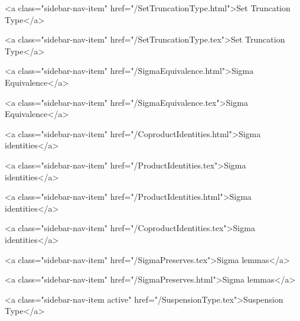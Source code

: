       
        
          <a class="sidebar-nav-item" href="/SetTruncationType.html">Set Truncation Type</a>
        
      
    
      
        
          <a class="sidebar-nav-item" href="/SetTruncationType.tex">Set Truncation Type</a>
        
      
    
      
        
          <a class="sidebar-nav-item" href="/SigmaEquivalence.html">Sigma Equivalence</a>
        
      
    
      
        
          <a class="sidebar-nav-item" href="/SigmaEquivalence.tex">Sigma Equivalence</a>
        
      
    
      
        
          <a class="sidebar-nav-item" href="/CoproductIdentities.html">Sigma identities</a>
        
      
    
      
        
          <a class="sidebar-nav-item" href="/ProductIdentities.tex">Sigma identities</a>
        
      
    
      
        
          <a class="sidebar-nav-item" href="/ProductIdentities.html">Sigma identities</a>
        
      
    
      
        
          <a class="sidebar-nav-item" href="/CoproductIdentities.tex">Sigma identities</a>
        
      
    
      
        
          <a class="sidebar-nav-item" href="/SigmaPreserves.tex">Sigma lemmas</a>
        
      
    
      
        
          <a class="sidebar-nav-item" href="/SigmaPreserves.html">Sigma lemmas</a>
        
      
    
      
        
          <a class="sidebar-nav-item active" href="/SuspensionType.tex">Suspension Type</a>
        
